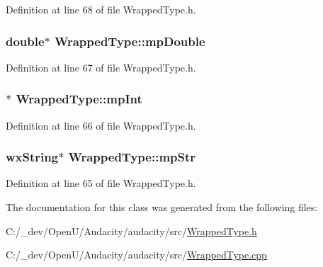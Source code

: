 Definition at line 68 of file Wrapped\+Type.\+h.

\subsubsection[{\texorpdfstring{mp\+Double}{mpDouble}}]{\setlength{\rightskip}{0pt plus 5cm}double$\ast$ Wrapped\+Type\+::mp\+Double}\hypertarget{class_wrapped_type_a53d8541fff3590f80ea6b8a6ef8d65c0}{}\label{class_wrapped_type_a53d8541fff3590f80ea6b8a6ef8d65c0}


Definition at line 67 of file Wrapped\+Type.\+h.

\subsubsection[{\texorpdfstring{mp\+Int}{mpInt}}]{$\ast$ Wrapped\+Type\+::mp\+Int}\hypertarget{class_wrapped_type_ad73dcb462b8a9ec4c23a736e739e9280}{}\label{class_wrapped_type_ad73dcb462b8a9ec4c23a736e739e9280}


Definition at line 66 of file Wrapped\+Type.\+h.

\subsubsection[{\texorpdfstring{mp\+Str}{mpStr}}]{\setlength{\rightskip}{0pt plus 5cm}wx\+String$\ast$ Wrapped\+Type\+::mp\+Str}\hypertarget{class_wrapped_type_afc8547776eb19d07ec12fe8198fc42bc}{}\label{class_wrapped_type_afc8547776eb19d07ec12fe8198fc42bc}


Definition at line 65 of file Wrapped\+Type.\+h.



The documentation for this class was generated from the following files\+:\begin{DoxyCompactItemize}
\item 
C\+:/\+\_\+dev/\+Open\+U/\+Audacity/audacity/src/\hyperlink{_wrapped_type_8h}{Wrapped\+Type.\+h}\item 
C\+:/\+\_\+dev/\+Open\+U/\+Audacity/audacity/src/\hyperlink{_wrapped_type_8cpp}{Wrapped\+Type.\+cpp}\end{DoxyCompactItemize}
